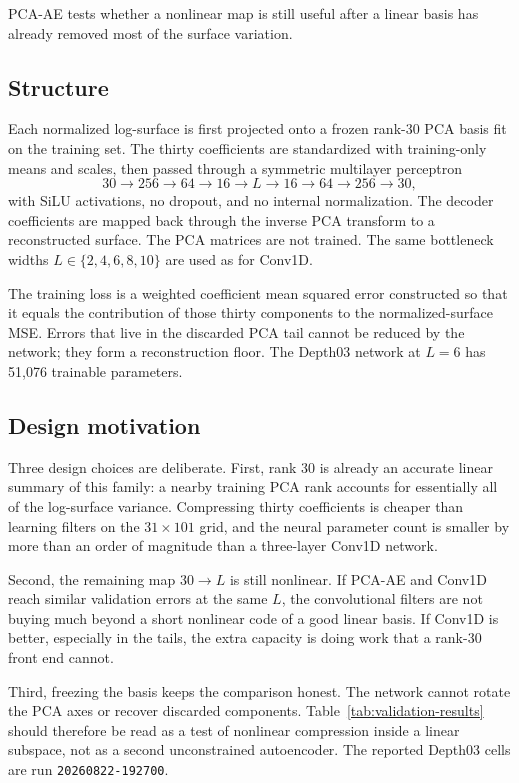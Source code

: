 PCA-AE tests whether a nonlinear map is still useful after a linear basis
has already removed most of the surface variation.

\subsection{Structure}

Each normalized log-surface is first projected onto a frozen rank-30 PCA
basis fit on the training set.  The thirty coefficients are standardized
with training-only means and scales, then passed through a symmetric
multilayer perceptron
\begin{equation}
  30\to 256\to 64\to 16\to L\to 16\to 64\to 256\to 30,
\end{equation}
with SiLU activations, no dropout, and no internal normalization.  The
decoder coefficients are mapped back through the inverse PCA transform to a
reconstructed surface.  The PCA matrices are not trained.  The same
bottleneck widths $L\in\{2,4,6,8,10\}$ are used as for Conv1D.

The training loss is a weighted coefficient mean squared error constructed
so that it equals the contribution of those thirty components to the
normalized-surface MSE.  Errors that live in the discarded PCA tail cannot
be reduced by the network; they form a reconstruction floor.  The Depth03
network at $L=6$ has 51,076 trainable parameters.

\subsection{Design motivation}

Three design choices are deliberate.  First, rank 30 is already an accurate
linear summary of this family: a nearby training PCA rank accounts for
essentially all of the log-surface variance.  Compressing thirty
coefficients is cheaper than learning filters on the $31\times101$ grid, and
the neural parameter count is smaller by more than an order of magnitude
than a three-layer Conv1D network.

Second, the remaining map $30\to L$ is still nonlinear.  If PCA-AE and
Conv1D reach similar validation errors at the same $L$, the convolutional
filters are not buying much beyond a short nonlinear code of a good linear
basis.  If Conv1D is better, especially in the tails, the extra capacity is
doing work that a rank-30 front end cannot.

Third, freezing the basis keeps the comparison honest.  The network cannot
rotate the PCA axes or recover discarded components.  Table~\ref{tab:validation-results}
should therefore be read as a test of nonlinear compression inside a linear
subspace, not as a second unconstrained autoencoder.  The reported Depth03
cells are run \texttt{20260822-192700}.

